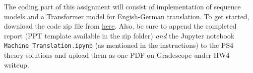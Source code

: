 The coding part of this assignment will consist of implementation of sequence models and a Transformer model for Engish-German translation. 
To get started, download the code zip file from \href{https://www.cc.gatech.edu/classes/AY2022/cs7643_fall/assets/assignment4.zip}{here}. Also, be sure to append the completed report (PPT template available in the zip folder) \emph{and} the Jupyter notebook \texttt{Machine\_Translation.ipynb} (as mentioned in the instructions) 
to the PS4 theory solutions and upload them as one PDF on Gradescope under HW4 writeup. \\
